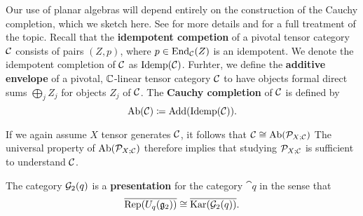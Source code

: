 Our use of planar algebras will depend entirely on the construction of the Cauchy completion,
which we sketch here.
See \cite{cain_noah} for more details and \cite{tuba_wenzl} for a full treatment of the topic.
Recall that the {\bf idempotent competion} of a pivotal tensor category $\mathcal{C}$ consists of pairs $(Z,p)$,
where $p\in\operatorname{End}_{\mathcal{C}}(Z)$ is an idempotent.
We denote the idempotent completion of $\mathcal{C}$ as $\operatorname{Idemp}(\mathcal{C})$.
Furhter, we define the {\bf additive envelope} of a pivotal, $\mathbb{C}$-linear tensor category $\mathcal{C}$
to have objects formal direct sums $\bigoplus_j Z_j$ for objects $Z_j$ of $\mathcal{C}$.
The {\bf Cauchy completion} of $\mathcal{C}$ is defined by 
\[
    \operatorname{Ab}(\mathcal{C}) \coloneq \operatorname{Add}(\operatorname{Idemp}(\mathcal{C})).
\]

If we again assume $X$ tensor generates $\mathcal{C}$, it follows that $\mathcal{C} \cong \operatorname{Ab}(\mathcal{P}_{X;\mathcal{C}})$ \cite[Theorem3.4]{tuba_wenzl}
The universal property of $\operatorname{Ab}(\mathcal{P}_{X;\mathcal{C}})$ therefore implies 
that studying $\mathcal{P}_{X;\mathcal{C}}$ is sufficient to understand $\mathcal{C}$. 

The category $\mathcal{G}_2(q)$ is a {\bf presentation} for the category $\cat{q}$ in the sense that
\[
\overline{\operatorname{Rep}(U_q(\mathfrak{g}_2))} \cong \overline{\operatorname{Kar}(\mathcal{G}_2(q))}.
\]




